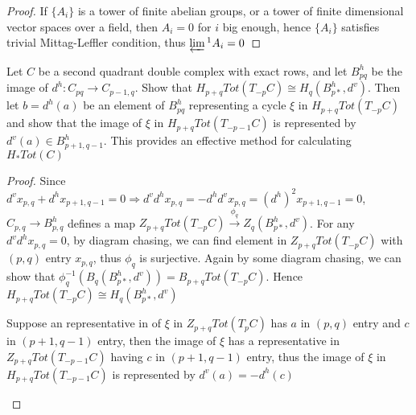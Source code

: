 \documentclass{article}
\newenvironment{exercise}[2][Exercise]{\begin{trivlist}
\item[\hskip \labelsep {\bfseries #1}\hskip \labelsep {\bfseries #2.}]}{\end{trivlist}}
\theoremstyle{definition}
\theoremstyle{remark}
\theoremstyle{definition}
\begin{document}
\begin{proof}
If $\{A_i\}$ is a tower of finite abelian groups, or a tower of finite dimensional vector spaces over a field, then $A_i=0$ for $i$ big enough, hence $\{A_i\}$ satisfies trivial Mittag-Leffler condition, thus $\varprojlim\textstyle^1A_i=0$
\end{proof}

\begin{exercise}{\textbf{3.5.4}}
Let $C$ be a second quadrant double complex with exact rows, and let $B^h_{pq}$ be the image of $d^h:C_{pq}\to C_{p-1,q}$. Show that $H_{p+q}Tot(T_{-p}C)\cong H_q(B^h_{p*},d^v)$. Then let $b=d^h(a)$ be an element of $B_{pq}^h$ representing a cycle $\xi$ in $H_{p+q}Tot(T_{-p}C)$ and show that the image of $\xi$ in $H_{p+q}Tot(T_{-p-1}C)$ is represented by $d^v(a)\in B^h_{p+1,q-1}$. This provides an effective method for calculating $H_*Tot(C)$
\end{exercise}

\begin{proof}
Since $d^vx_{p,q}+d^hx_{p+1,q-1}=0\Rightarrow d^vd^hx_{p,q}=-d^hd^vx_{p,q}=(d^h)^2x_{p+1,q-1}=0$, $C_{p,q}\to B_{p,q}^h$ defines a map $Z_{p+q}Tot(T_{-p}C)\xrightarrow{\phi_q} Z_q(B^h_{p*},d^v)$. For any $d^vd^hx_{p,q}=0$, by diagram chasing, we can find element in $Z_{p+q}Tot(T_{-p}C)$ with $(p,q)$ entry $x_{p,q}$, thus $\phi_q$ is surjective. Again by some diagram chasing, we can show that $\phi_q^{-1}(B_q(B^h_{p*},d^v))=B_{p+q}Tot(T_{-p}C)$. Hence $H_{p+q}Tot(T_{-p}C)\cong H_q(B^h_{p*},d^v)$ \par
Suppose an representative in of $\xi$ in $Z_{p+q}Tot(T_pC)$ has $a$ in $(p,q)$ entry and $c$ in $(p+1,q-1)$ entry, then the image of $\xi$ has a representative in $Z_{p+q}Tot(T_{-p-1}C)$ having $c$ in $(p+1,q-1)$ entry, thus the image of $\xi$ in $H_{p+q}Tot(T_{-p-1}C)$ is represented by $d^v(a)=-d^h(c)$
\begin{center}
\end{center}
\end{proof}
\end{document}
